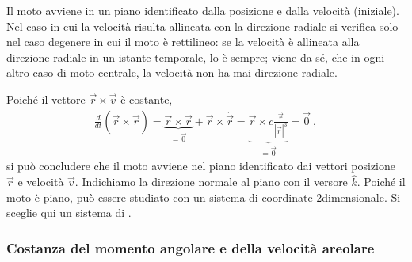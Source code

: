 \documentclass[letterpaper,10pt,italian]{jupyterBook}
\begin{document}
\sphinxAtStartPar
Il moto avviene in un piano identificato dalla posizione e dalla velocità (iniziale). Nel caso in cui la velocità risulta allineata con la direzione radiale si verifica solo nel caso degenere in cui il moto è rettilineo: se la velocità è allineata alla direzione radiale in un istante temporale, lo è sempre; viene da sé, che in ogni altro caso di moto centrale, la velocità non ha mai direzione radiale.

\sphinxAtStartPar
Poiché il vettore \(\vec{r} \times \vec{v}\) è costante,
\begin{equation*}
\begin{split}\frac{d}{dt} \left( \vec{r} \times \dot{\vec{r}} \right) = \underbrace{\dot{\vec{r}} \times \dot{\vec{r}}}_{= \vec{0}} + \vec{r} \times \ddot{\vec{r}} = \underbrace{\vec{r} \times c \frac{\vec{r}}{|\vec{r}|^3}}_{=\vec{0}} = \vec{0} \ ,\end{split}
\end{equation*}
\sphinxAtStartPar
si può concludere che il moto avviene nel piano identificato dai vettori posizione \(\vec{r}\) e velocità \(\vec{v}\). Indichiamo la direzione normale al piano con il versore \(\hat{k}\).
Poiché il moto è piano, può essere studiato con un sistema di coordinate 2\sphinxhyphen{}dimensionale. Si sceglie qui un sistema di {\hyperref[\detokenize{ch/mechanics/dynamics-central:physics-hs-mechanics-dynamics-motion-central-polar}]{}}.
\label{\detokenize{ch/mechanics/dynamics-central:physics-hs-mechanics-dynamics-motion-central-ang-mom}}\subsubsection*{Costanza del momento angolare e della velocità areolare}
\end{document}
